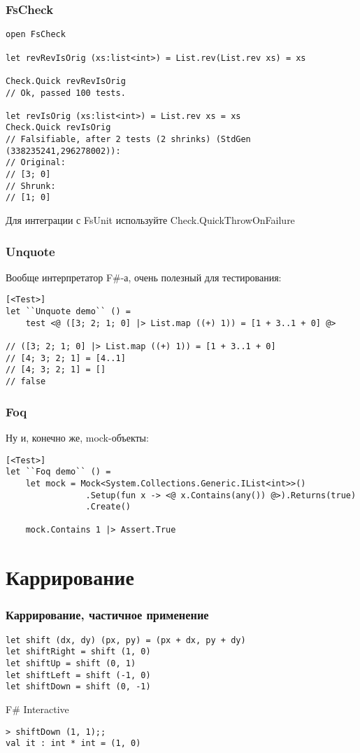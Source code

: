 \documentclass{../../slides-style}
\begin{document}
    \begin{frame}[fragile]
        \frametitle{FsCheck}
        \begin{verbatim}
open FsCheck

let revRevIsOrig (xs:list<int>) = List.rev(List.rev xs) = xs

Check.Quick revRevIsOrig
// Ok, passed 100 tests.

let revIsOrig (xs:list<int>) = List.rev xs = xs
Check.Quick revIsOrig
// Falsifiable, after 2 tests (2 shrinks) (StdGen (338235241,296278002)):
// Original:
// [3; 0]
// Shrunk:
// [1; 0]
        \end{verbatim}
        Для интеграции с FsUnit используйте Check.QuickThrowOnFailure
    \end{frame}

    \begin{frame}[fragile]
        \frametitle{Unquote}
        Вообще интерпретатор F\#-а, очень полезный для тестирования:
        \begin{verbatim}
[<Test>]
let ``Unquote demo`` () =
    test <@ ([3; 2; 1; 0] |> List.map ((+) 1)) = [1 + 3..1 + 0] @>

// ([3; 2; 1; 0] |> List.map ((+) 1)) = [1 + 3..1 + 0]
// [4; 3; 2; 1] = [4..1]
// [4; 3; 2; 1] = []
// false
        \end{verbatim}
    \end{frame}

    \begin{frame}[fragile]
        \frametitle{Foq}
        Ну и, конечно же, mock-объекты:
        \begin{verbatim}
[<Test>]
let ``Foq demo`` () =
    let mock = Mock<System.Collections.Generic.IList<int>>()
                .Setup(fun x -> <@ x.Contains(any()) @>).Returns(true)
                .Create()

    mock.Contains 1 |> Assert.True
        \end{verbatim}
    \end{frame}

    \section{Каррирование}

    \begin{frame}[fragile]
        \frametitle{Каррирование, частичное применение}
        \begin{verbatim}
let shift (dx, dy) (px, py) = (px + dx, py + dy)
let shiftRight = shift (1, 0)
let shiftUp = shift (0, 1)
let shiftLeft = shift (-1, 0)
let shiftDown = shift (0, -1)
        \end{verbatim}
        \begin{alertblock}{F\# Interactive}
            \begin{verbatim}
> shiftDown (1, 1);;
val it : int * int = (1, 0)
            \end{verbatim}
        \end{alertblock}
    \end{frame}
\end{document}
